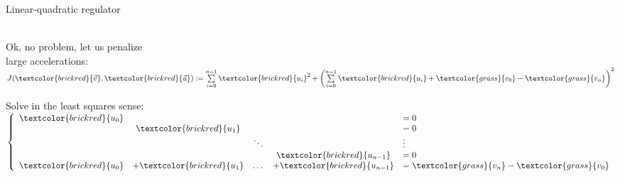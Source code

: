 \documentclass[UKenglish,aspectratio=169]{beamer}
\newcommand\unknown[1]{\textcolor{brickred}{#1}}
\newcommand\known[1]{\textcolor{grass}{#1}}
\begin{document}
\begin{frame}{Linear-quadratic regulator}
\begin{minipage}{.5\linewidth}
~\\
Ok, no problem, let us penalize\\ large accelerations:\\
$
J(\unknown{\vec{v}}, \unknown{\vec{u}}) := \sum\limits_{i=0}^{n-1} \unknown{u_i}^2 + \left(\sum\limits_{i=0}^{n-1} \unknown{u_i} + \known{v_0} - \known{v_n}\right)^2 
$
\end{minipage}
\qquad
\begin{minipage}{.4\linewidth}
Solve in the least squares sense:\\
$
\left \{ \begin{array}{ccccl}
\unknown{u_0} &       &       &           & = 0 \\
              & \unknown{u_1} &       &           & = 0 \\
    &       &   \ddots    &     &      \vdots       \\
              &                 &       &   \unknown{u_{n-1}} & = 0 \\
\unknown{u_0} & + \unknown{u_1} & \dots & + \unknown{u_{n-1}} & = \known{v_n} - \known{v_0} \\
\end{array} \right.
$
\end{minipage}
\pause
\end{frame}
\end{document}
